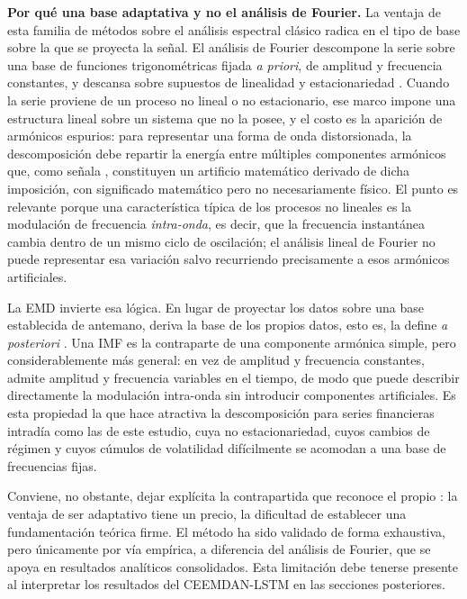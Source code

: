 \documentclass[12pt]{paper}
\begin{document}
\medskip
\noindent\textbf{Por qué una base adaptativa y no el análisis de Fourier.}
La ventaja de esta familia de métodos sobre el análisis espectral clásico radica en el tipo de base sobre la que se proyecta la señal. El análisis de Fourier descompone la serie sobre una base de funciones trigonométricas fijada \emph{a priori}, de amplitud y frecuencia constantes, y descansa sobre supuestos de linealidad y estacionariedad \citep{huang1998emd, huang2005hht}. Cuando la serie proviene de un proceso no lineal o no estacionario, ese marco impone una estructura lineal sobre un sistema que no la posee, y el costo es la aparición de armónicos espurios: para representar una forma de onda distorsionada, la descomposición debe repartir la energía entre múltiples componentes armónicos que, como señala \citet{huang2005hht}, constituyen un artificio matemático derivado de dicha imposición, con significado matemático pero no necesariamente físico. El punto es relevante porque una característica típica de los procesos no lineales es la modulación de frecuencia \emph{intra-onda}, es decir, que la frecuencia instantánea cambia dentro de un mismo ciclo de oscilación; el análisis lineal de Fourier no puede representar esa variación salvo recurriendo precisamente a esos armónicos artificiales.

La EMD invierte esa lógica. En lugar de proyectar los datos sobre una base establecida de antemano, deriva la base de los propios datos, esto es, la define \emph{a posteriori} \citep{huang2005hht}. Una IMF es la contraparte de una componente armónica simple, pero considerablemente más general: en vez de amplitud y frecuencia constantes, admite amplitud y frecuencia variables en el tiempo, de modo que puede describir directamente la modulación intra-onda sin introducir componentes artificiales. Es esta propiedad la que hace atractiva la descomposición para series financieras intradía como las de este estudio, cuya no estacionariedad, cuyos cambios de régimen y cuyos cúmulos de volatilidad difícilmente se acomodan a una base de frecuencias fijas.

Conviene, no obstante, dejar explícita la contrapartida que reconoce el propio \citet{huang2005hht}: la ventaja de ser adaptativo tiene un precio, la dificultad de establecer una fundamentación teórica firme. El método ha sido validado de forma exhaustiva, pero únicamente por vía empírica, a diferencia del análisis de Fourier, que se apoya en resultados analíticos consolidados. Esta limitación debe tenerse presente al interpretar los resultados del CEEMDAN-LSTM en las secciones posteriores.
\end{document}
